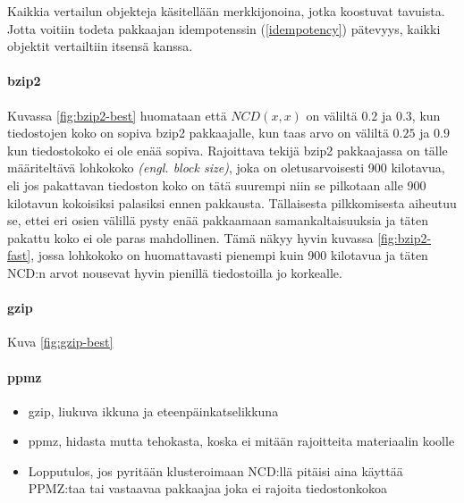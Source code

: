 \documentclass[12pt,finnish]{tktltiki2}
\theoremstyle{definition}
\theoremstyle{remark}
\newcommand{\engl}[1]{\emph{(engl. #1)}}
\begin{document}
      Kaikkia vertailun objekteja käsitellään merkkijonoina, jotka koostuvat tavuista.
      Jotta voitiin todeta pakkaajan idempotenssin (\ref{idempotency}) pätevyys, kaikki objektit vertailtiin itsensä kanssa.

      \paragraph{bzip2} %
      \label{par:bzip2}
        Kuvassa \ref{fig:bzip2-best} huomataan että $NCD(x,x)$ on väliltä $0.2$ ja $0.3$, kun tiedostojen koko on sopiva bzip2 pakkaajalle, kun taas arvo on väliltä $0.25$ ja $0.9$ kun tiedostokoko ei ole enää sopiva.
        Rajoittava tekijä bzip2 pakkaajassa on tälle määriteltävä lohkokoko \engl{block size}, joka on oletusarvoisesti 900 kilotavua, eli jos pakattavan tiedoston koko on tätä suurempi niin se pilkotaan alle 900 kilotavun kokoisiksi palasiksi ennen pakkausta.
        Tällaisesta pilkkomisesta aiheutuu se, ettei eri osien välillä pysty enää pakkaamaan samankaltaisuuksia ja täten pakattu koko ei ole paras mahdollinen.
        Tämä näkyy hyvin kuvassa \ref{fig:bzip2-fast}, jossa lohkokoko on huomattavasti pienempi kuin 900 kilotavua ja täten NCD:n arvot nousevat hyvin pienillä tiedostoilla jo korkealle.

      \paragraph{gzip} %
      \label{par:gzip}
        Kuva \ref{fig:gzip-best}

      \paragraph{ppmz} %
      \label{par:ppmz}


    \begin{itemize}
      \item gzip, liukuva ikkuna ja eteenpäinkatselikkuna
      \item ppmz, hidasta mutta tehokasta, koska ei mitään rajoitteita materiaalin koolle
      \item Lopputulos, jos pyritään klusteroimaan NCD:llä pitäisi aina käyttää PPMZ:taa tai vastaavaa pakkaajaa joka ei rajoita tiedostonkokoa
    \end{itemize}
\end{document}
